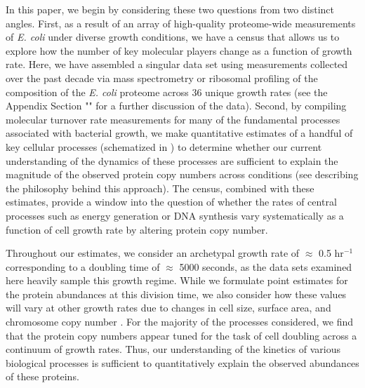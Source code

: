 In this paper, we begin by considering these two questions from two distinct
angles. First, as a result of an array of high-quality proteome-wide
measurements of \textit{E. coli} under diverse growth conditions, we have a
census that allows us to explore how the number of key molecular players change
as a function of growth rate. Here, we have assembled a singular data set using
measurements collected over the past decade via mass spectrometry
\citep{schmidt2016, peebo2015, valgepea2013} or ribosomal profiling
\citep{li2014} of the composition of the \textit{E. coli} proteome across 36
unique growth rates (see the Appendix Section "" for
a further discussion of the data). Second, by compiling molecular turnover rate
measurements for many of the fundamental processes associated with bacterial
growth, we make quantitative estimates of a handful of key cellular processes
(schematized in ) to determine whether our current understanding
of the dynamics of these processes are sufficient to explain the magnitude of
the observed protein copy numbers across conditions (see 
describing the philosophy behind this approach). The census, combined with these
estimates, provide a window into the question of whether the rates of central
processes such as energy generation or DNA synthesis vary systematically as a
function of cell growth rate by altering protein copy number.

Throughout our estimates, we consider an archetypal growth rate of $\approx$
0.5 hr$^{-1}$ corresponding to a doubling time of $\approx$ 5000 seconds, as
the data sets examined here heavily sample this growth regime. While we
formulate point estimates for the protein abundances at this division time,
we also consider how these values will vary at other growth rates due to
changes in cell size, surface area, and chromosome copy number
\citep{taheriaraghi2015, harris2018}. For the majority of the processes
considered, we find that the protein copy numbers appear tuned for the task
of cell doubling across a continuum of growth rates. Thus, our understanding
of the kinetics of various biological processes is sufficient to
quantitatively explain the observed abundances of these proteins.

